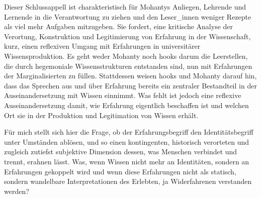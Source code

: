 Dieser Schlussappell ist charakteristisch für Mohantys Anliegen, Lehrende und
Lernende in die Verantwortung zu ziehen und den Leser\_innen weniger Rezepte
als viel mehr Aufgaben mitzugeben. Sie fordert, eine kritische Analyse der
Verortung, Konstruktion und Legitimierung von Erfahrung in der Wissenschaft,
kurz, einen reflexiven Umgang mit Erfahrungen in universitärer
Wissensproduktion. Es geht weder Mohanty noch hooks darum die Leerstellen, die
durch hegemoniale Wissensstrukturen entstanden sind, nun mit Erfahrungen der
Marginalisierten zu füllen. Stattdessen weisen hooks und Mohanty darauf hin,
dass das Sprechen aus und über Erfahrung bereits ein zentraler Bestandteil in
der Auseinandersetzung mit Wissen einnimmt. Was fehlt ist jedoch eine reflexive
Auseinandersetzung damit, wie Erfahrung eigentlich beschaffen ist und welchen
Ort sie in der Produktion und Legitimation von Wissen erhält. 

Für mich stellt sich hier die Frage, ob der Erfahrungsbegriff den
Identitätsbegriff unter Umständen ablösen, und so einen kontingenten,
historisch verorteten und zugleich zutiefst subjektive Dimension dessen, was
Menschen verbindet und trennt, erahnen lässt.  Was, wenn Wissen nicht mehr an
Identitäten, sondern an Erfahrungen gekoppelt wird und wenn diese Erfahrungen
nicht als statisch, sondern wandelbare Interpretationen des Erlebten, ja
Widerfahrenen verstanden werden? 
